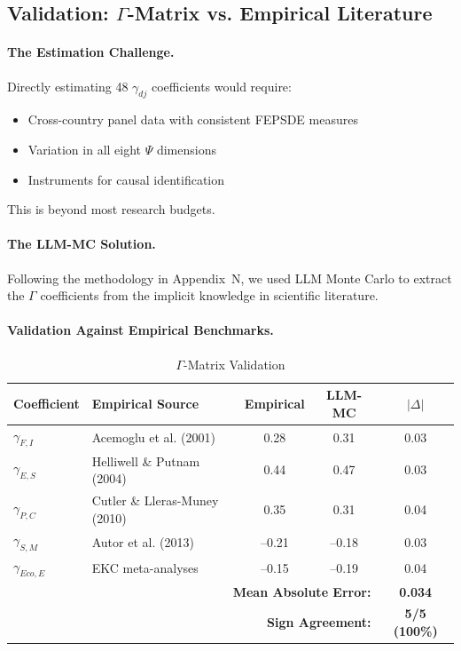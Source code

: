 \subsection{Validation: $\Gamma$-Matrix vs. Empirical Literature}

\paragraph{The Estimation Challenge.}
Directly estimating 48 $\gamma_{dj}$ coefficients would require:
\begin{itemize}
\item Cross-country panel data with consistent FEPSDE measures
\item Variation in all eight $\Psi$ dimensions
\item Instruments for causal identification
\end{itemize}

This is beyond most research budgets.

\paragraph{The LLM-MC Solution.}
Following the methodology in Appendix~N, we used LLM Monte Carlo to extract 
the $\Gamma$ coefficients from the implicit knowledge in scientific literature.

\paragraph{Validation Against Empirical Benchmarks.}

\begin{table}[htbp]
\centering
\caption{$\Gamma$-Matrix Validation}
\label{tab:app-c-gamma-validation}
\renewcommand{\arraystretch}{1.3}
\begin{tabular}{@{}llccc@{}}
\toprule
\textbf{Coefficient} & \textbf{Empirical Source} & \textbf{Empirical} & \textbf{LLM-MC} & \textbf{$|\Delta|$} \\
\midrule
$\gamma_{F,I}$ & Acemoglu et al. (2001) & 0.28 & 0.31 & 0.03 \\
$\gamma_{E,S}$ & Helliwell \& Putnam (2004) & 0.44 & 0.47 & 0.03 \\
$\gamma_{P,C}$ & Cutler \& Lleras-Muney (2010) & 0.35 & 0.31 & 0.04 \\
$\gamma_{S,M}$ & Autor et al. (2013) & --0.21 & --0.18 & 0.03 \\
$\gamma_{Eco,E}$ & EKC meta-analyses & --0.15 & --0.19 & 0.04 \\
\midrule
\multicolumn{4}{r}{\textbf{Mean Absolute Error:}} & \textbf{0.034} \\
\multicolumn{4}{r}{\textbf{Sign Agreement:}} & \textbf{5/5 (100\%)} \\
\bottomrule
\end{tabular}
\end{table}

